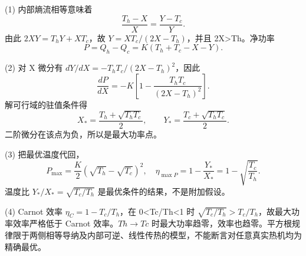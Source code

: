(1) 内部熵流相等意味着
\[
\frac{T_h-X}{X}=\frac{Y-T_c}{Y}.
\]
由此 \(2XY=T_hY+XT_c\)，故 \(Y=XT_c/(2X-T_h)\)，并且 2X>Th。净功率
\[
P=Q_h-Q_c=K(T_h+T_c-X-Y).
\]

(2) 对 X 微分有 \(dY/dX=-T_hT_c/(2X-T_h)^2\)，因此
\[
\frac{dP}{dX}=-K\left[1-\frac{T_hT_c}{(2X-T_h)^2}\right].
\]
解可行域的驻值条件得
\[
X_*=\frac{T_h+\sqrt{T_hT_c}}{2},\qquad
Y_*=\frac{T_c+\sqrt{T_hT_c}}{2}.
\]
二阶微分在该点为负，所以是最大功率点。

(3) 把最优温度代回，
\[
P_{\max}=\frac K2(\sqrt{T_h}-\sqrt{T_c})^2,\quad
\eta_{\max P}=1-\frac{Y_*}{X_*}=1-\sqrt{\frac{T_c}{T_h}}.
\]
温度比 \(Y_*/X_*=\sqrt{T_c/T_h}\) 是最优条件的结果，不是附加假设。

(4) Carnot 效率 \(\eta_C=1-T_c/T_h\)，在 0<Tc/Th<1 时 \(\sqrt{T_c/T_h}>T_c/T_h\)，故最大功率效率严格低于 Carnot 效率。\(Th\to Tc\) 时最大功率趋零，效率也趋零。平方根规律限于两侧相等导纳及内部可逆、线性传热的模型，不能断言对任意真实热机均为精确最优。
